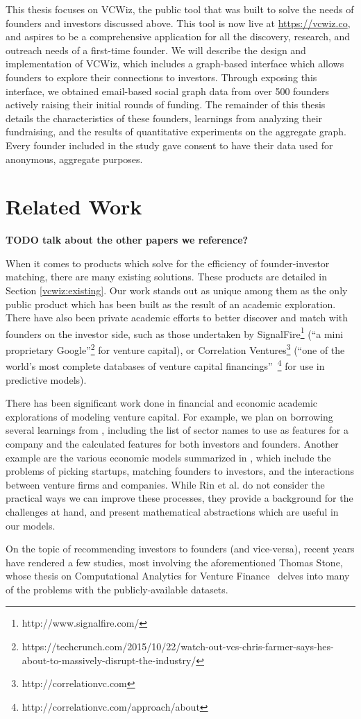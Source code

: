 This thesis focuses on VCWiz, the public tool that was built to solve the needs of founders and investors discussed above. This tool is now live at \url{https://vcwiz.co}, and aspires to be a comprehensive application for all the discovery, research, and outreach needs of a first-time founder. We will describe the design and implementation of VCWiz, which includes a graph-based interface which allows founders to explore their connections to investors. Through exposing this interface, we obtained email-based social graph data from over 500 founders actively raising their initial rounds of funding. The remainder of this thesis details the characteristics of these founders, learnings from analyzing their fundraising, and the results of quantitative experiments on the aggregate graph. Every founder included in the study gave consent to have their data used for anonymous, aggregate purposes.

\section{Related Work}

\textbf{TODO talk about the other papers we reference?}

When it comes to products which solve for the efficiency of founder-investor matching, there are many existing solutions. These products are detailed in Section \ref{vcwiz:existing}. Our work stands out as unique among them as the only public product which has been built as the result of an academic exploration. There have also been private academic efforts to better discover and match with founders on the investor side, such as those undertaken by SignalFire\footnote{http://www.signalfire.com/} (``a  mini proprietary Google''\footnote{https://techcrunch.com/2015/10/22/watch-out-vcs-chris-farmer-says-hes-about-to-massively-disrupt-the-industry/} for venture capital), or Correlation Ventures\footnote{http://correlationvc.com} (``one of the world’s most complete databases of venture capital financings''~\footnote{http://correlationvc.com/approach/about} for use in predictive models).

There has been significant work done in financial and economic academic explorations of modeling venture capital. For example, we plan on borrowing several learnings from \cite{2017arXiv170604229H}, including the list of sector names to use as features for a company and the calculated features for both investors and founders. Another example are the various economic models summarized in \cite{venture-survey}, which include the problems of picking startups, matching founders to investors, and the interactions between venture firms and companies. While Rin et al. do not consider the practical ways we can improve these processes, they provide a background for the challenges at hand, and present mathematical abstractions which are useful in our models.

On the topic of recommending investors to founders (and vice-versa), recent years have rendered a few studies, most involving the aforementioned Thomas Stone, whose thesis on Computational Analytics for Venture Finance~\cite{stone2014computational} delves into many of the problems with the publicly-available datasets.
